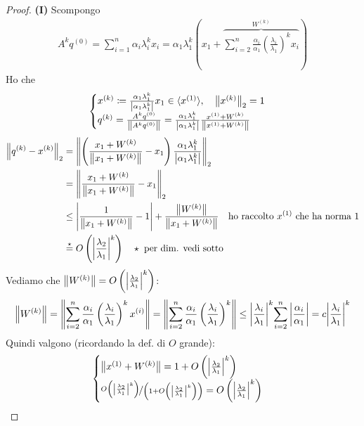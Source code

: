 \documentclass[a4paper,10pt]{article}
\theoremstyle{definition}
\theoremstyle{indentdefinition}
\theoremstyle{indenttheorem}
\theoremstyle{myremark}
\theoremstyle{indentgeneral}
\theoremstyle{plain}
\theoremstyle{plain}
\begin{document}
\begin{proof}
\textbf{(I)} Scompongo
\begin{align*}
A^{k}q^{\left(0\right)}  =\sum_{i=1}^{n}\alpha_{i}\lambda_{i}^{k}x_{i}=\alpha_{1}\lambda_{1}^{k}(x_{1}+\overset{W^{\left(k\right)}}{\overbrace{\sum_{i=2}^{n}\frac{\alpha_{i}}{\alpha_{1}}\left(\frac{\lambda_{i}}{\lambda_{1}}\right)^{k}x_{i}}})
\end{align*}
Ho che 
$$\begin{cases}
    x^{\left(k\right)}  \coloneqq\frac{\alpha_{1}\lambda_{1}^{k}}{\left|\alpha_{1}\lambda_{1}^{k}\right|}x_{1} \in \langle x^{(1)}\rangle,\quad \norm{x^{(k)}}_2=1\\
    q^{(k)}=\frac{A^kq^{(0)}}{\norm{A^kq^{(0)}}}=\frac{\alpha_1\lambda_1^k}{\abs{\alpha_1\lambda_1^k}}\frac{x^{(1)}+W^{(k)}}{\norm{x^{(1)}+W^{(k)}}}
\end{cases}$$
\begin{align*}
\left\Vert q^{\left(k\right)}-x^{\left(k\right)}\right\Vert _{2}&=
\left\Vert \left(\frac{x_{1}+W^{\left(k\right)}}{\left\Vert x_{1}+W^{\left(k\right)}\right\Vert }-x_{1}\right)\frac{\alpha_1\lambda_1^k}{\abs{\alpha_1\lambda_1^k}}\right\Vert _{2}\\
&=\left\Vert \frac{x_{1}+W^{\left(k\right)}}{\left\Vert x_{1}+W^{\left(k\right)}\right\Vert }-x_{1}\right\Vert _{2}\\
&\leq\left|\frac{1}{\left\Vert x_{1}+W^{\left(k\right)}\right\Vert }-1\right|+\frac{\left\Vert W^{\left(k\right)}\right\Vert }{\left\Vert x_{1}+W^{\left(k\right)}\right\Vert } \quad\text{ho raccolto $x^{(1)}$ che ha norma 1}\\
& \overset{\star}{=}O\left(\abs{\frac{\lambda_{2}}{\lambda_{1}}}^{k}\right) \quad \star\text{ per dim. vedi sotto}
\end{align*}
Vediamo che $\norm{W^{(k)}}=O\left(\abs{\frac{\lambda_{2}}{\lambda_{1}}}^{k}\right)$:
$$\norm{W^{(k)}}=\norm{\sum_{i=2}^{n}\frac{\alpha_{i}}{\alpha_{1}}\left(\frac{\lambda_{i}}{\lambda_{1}}\right)^{k}x^{(i)}}=\norm{\sum_{i=2}^{n}\frac{\alpha_{i}}{\alpha_{1}}\left(\frac{\lambda_{i}}{\lambda_{1}}\right)^{k}}\le \abs{\frac{\lambda_{i}}{\lambda_{1}}}^{k}{\sum_{i=2}^{n}\abs{\frac{\alpha_{i}}{\alpha_{1}}}}=c\abs{\frac{\lambda_{i}}{\lambda_{1}}}^{k}$$
Quindi valgono (ricordando la def. di $O$ grande):
$$\begin{cases}
    \norm{x^{(1)}+W^{(k)}}=1+O\left(\abs{\frac{\lambda_{2}}{\lambda_{1}}}^{k}\right) \\
    \nicefrac{O\left(\abs{\frac{\lambda_{2}}{\lambda_{1}}}^{k}\right)}{\left(1+O\left(\abs{\frac{\lambda_{2}}{\lambda_{1}}}^{k}\right)\right)}=O\left(\abs{\frac{\lambda_{2}}{\lambda_{1}}}^{k}\right)

\end{cases}$$
\end{proof}
\end{document}
